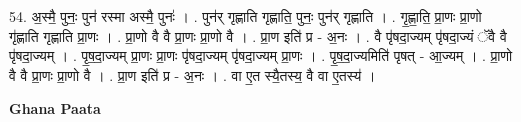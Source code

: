 \documentclass[17pt]{extarticle}
\begin{document}
54. अ॒स्मै॒ पुनः॒ पुन॑ रस्मा अस्मै॒ पुनः॑ । . पुन॑र् गृह्णाति गृह्णाति॒ पुनः॒ पुन॑र् गृह्णाति । . गृ॒ह्णा॒ति॒ प्रा॒णः प्रा॒णो गृ॑ह्णाति गृह्णाति प्रा॒णः । . प्रा॒णो वै वै प्रा॒णः प्रा॒णो वै । . प्रा॒ण इति॑ प्र - अ॒नः । . वै पृ॑षदा॒ज्यम् पृ॑षदा॒ज्यं ॅवै वै पृ॑षदा॒ज्यम् । . पृ॒ष॒दा॒ज्यम् प्रा॒णः प्रा॒णः पृ॑षदा॒ज्यम् पृ॑षदा॒ज्यम् प्रा॒णः । . पृ॒ष॒दा॒ज्यमिति॑ पृषत् - आ॒ज्यम् । . प्रा॒णो वै वै प्रा॒णः प्रा॒णो वै । . प्रा॒ण इति॑ प्र - अ॒नः । . वा ए॒त स्यै॒तस्य॒ वै वा ए॒तस्य॑ । \newline

\textbf{Ghana Paata } \newline
\end{document}
